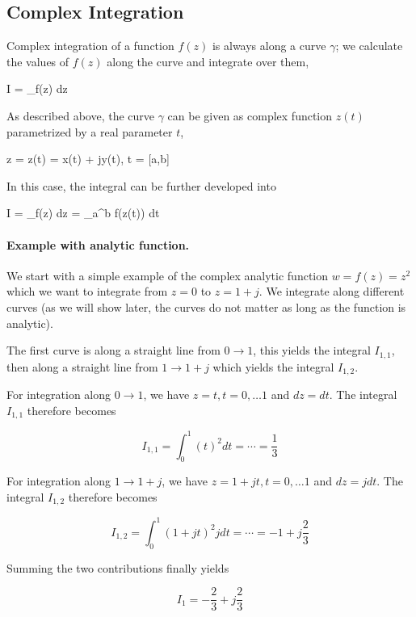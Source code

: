 \subsection{Complex Integration}

Complex integration of a function $f(z)$ is always along a curve $\gamma$; we calculate the values of $f(z)$ along the curve and integrate over them,

\bee
I = \int_\gamma f(z) dz
\eee

As described above, the curve $\gamma$ can be given as complex function $z(t)$ parametrized by a real parameter $t$,

\bee
z = z(t) = x(t) + jy(t), \quad t = [a,b]
\eee

In this case, the integral can be further developed into

\bee
I = \int_\gamma f(z) dz = \int_{a}^b f(z(t))  dt
\eee



\paragraph{Example with analytic function.} We start with a simple example of the complex analytic function $w = f(z) = z^2$ which we want to integrate from $z = 0$ to $z= 1+j$. We integrate along different curves (as we will show later, the curves do not matter as long as the function is analytic).

The first curve is along a straight line from $0 \rightarrow 1$, this yields the integral $I_{1,1}$, then along a straight line from $1 \rightarrow 1+j$ which yields the integral $I_{1,2}$.

For integration along $0 \rightarrow 1$, we have $z = t, t=0,\ldots 1$ and $dz = dt$. The integral $I_{1,1}$ therefore becomes

\begin{equation*}
    I_{1,1} = \int_0^1 (t)^2 dt = \cdots = \frac{1}{3}
\end{equation*}

For integration along $1 \rightarrow 1+j$, we have $z=1+jt, t=0,\ldots 1$ and $dz = j dt$. The integral $I_{1,2}$ therefore becomes

\begin{equation*}
    I_{1,2} = \int_0^1 (1 + jt)^2 j dt = \cdots = -1 + j\frac{2}{3}
\end{equation*}

Summing the two contributions finally yields

\begin{equation*}
    I_{1} = -\frac{2}{3} + j\frac{2}{3}
\end{equation*}

